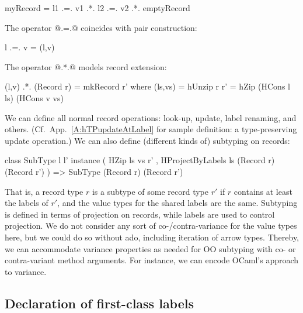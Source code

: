 \begin{code}
 myRecord =  l1 .=. v1
         .*. l2 .=. v2
         .*. emptyRecord
\end{code}

\noindent
The operator @.=.@ coincides with pair construction:
\begin{code}
 l .=. v = (l,v) 
\end{code}

\noindent
The operator @.*.@ models record extension:

\begin{code}
 (l,v) .*. (Record r) = mkRecord r'
    where
     (ls,vs) = hUnzip r
     r'      = hZip (HCons l ls) (HCons v vs)
\end{code}

\noindent
We can define all normal record operations: look-up, update, label
renaming, and others. (Cf.\ App.~\ref{A:hTPupdateAtLabel} for sample
definition: a type-preserving update operation.) We can also define
(different kinds of) subtyping on records:

\begin{code}
 class SubType l l'
 instance ( HZip ls vs r'
      , HProjectByLabels ls (Record r) (Record r') )
  =>    SubType (Record r) (Record r')
\end{code}

\noindent
That is, a record type $r$ is a subtype of some record type $r'$ if
$r$ contains at least the labels of $r'$, and the value types for the
shared labels are the same. Subtyping is defined in terms of
projection on records, while labels are used to control projection.
We do not consider any sort of co-/contra-variance for the value types
here, but we could do so without ado, including iteration of arrow
types. Thereby, we can accommodate variance properties as needed for
OO subtyping with co- or contra-variant method arguments. For
instance, we can encode OCaml's approach to variance.






\subsection{Declaration of first-class labels}

